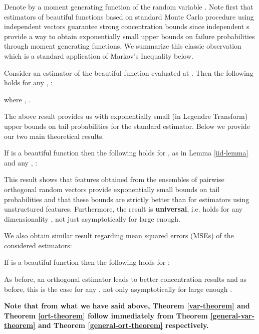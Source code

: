 Denote by  a moment generating function of the random variable .
Note first that estimators of beautiful functions based on standard Monte Carlo procedure using independent vectors  guarantee strong concentration bounds since 
independent s provide a way to obtain exponentially small upper bounds on failure probabilities through moment generating functions.
We summarize this classic observation which is a standard application of Markov's Inequality below. \\

\begin{lemma}
\label{iid-lemma}
Consider an estimator  of the beautiful function  evaluated at . Then the following holds for any , :

where , .
\end{lemma}

The above result provides us with exponentially small (in Legendre Transform) upper bounds on tail probabilities for the standard estimator.
Below we provide our two main theoretical results. 

\begin{theorem}
\label{general-ort-theorem}
If  is a beautiful function then the following holds for ,  as in Lemma \ref{iid-lemma} and any , : 

\end{theorem}

This result shows that features obtained from the ensembles of pairwise orthogonal random vectors provide exponentially small bounds on tail probabilities and that these bounds are strictly better than for estimators using unstructured features. Furthermore, the result is \textbf{universal}, i.e. holds for any dimensionality , not just asymptotically for  large enough.

We also obtain similar result regarding mean squared errors (MSEs) of the considered estimators:

\begin{theorem}
\label{general-var-theorem}
If  is a beautiful function then the following holds for : 

\end{theorem}
As before, an orthogonal estimator leads to better concentration results and as before, this is the case for any , not only asymptotically for large enough .

\textbf{Note that from what we have said above, Theorem \ref{var-theorem} and Theorem \ref{ort-theorem} follow immediately from Theorem \ref{general-var-theorem} and Theorem \ref{general-ort-theorem} respectively.} 


